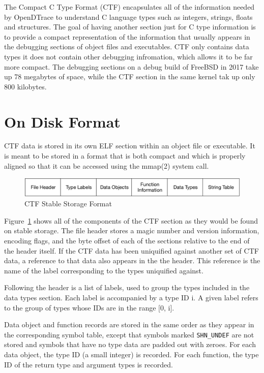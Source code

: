 The Compact C Type Format (CTF) encapsulates all of the information
needed by OpenDTrace to understand C language types such as integers,
strings, floats and structures.  The goal of having another section
just for C type information is to provide a compact representation of
the information that usually appears in the debugging sections of
object files and executables.  CTF only contains data types it
does not contain other debugging infromation, which allows it to be
far more compact.  The debugging sections on a debug build of FreeBSD
in 2017 take up 78 megabytes of space, while the CTF section in the
same kernel tak up only 800 kilobytes. 

\section{On Disk Format}
\label{sec:ctf-on-disk-format}

CTF data is stored in its own ELF section within an object file or
executable.  It is meant to be stored in a format that is both compact
and which is properly aligned so that it can be accessed using the
mmap(2) system call.

\begin{figure}[h]
  \centering
  \includegraphics[width=.8\textwidth]{ctf-stable-format}
  \caption{CTF Stable Storage Format}
  \label{fig:ctf-stable-storage-format}
\end{figure}

Figure~\ref{fig:ctf-stable-storage-format} shows all of the components
of the CTF section as they would be found on stable storage.  The file
header stores a magic number and version information, encoding flags,
and the byte offset of each of the sections relative to the end of the
header itself.  If the CTF data has been uniquified against another
set of CTF data, a reference to that data also appears in the the
header.  This reference is the name of the label corresponding to the
types uniquified against.

Following the header is a list of labels, used to group the types
included in the data types section.  Each label is accompanied by a
type ID i.  A given label refers to the group of types whose IDs are
in the range [0, i].

Data object and function records are stored in the same order as they
appear in the corresponding symbol table, except that symbols marked
\verb|SHN_UNDEF| are not stored and symbols that have no type data are padded
out with zeroes.  For each data object, the type ID (a small integer)
is recorded.  For each function, the type ID of the return type and
argument types is recorded.

